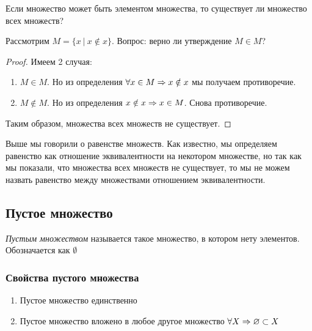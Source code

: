 Если множество может быть элементом множества, то существует ли множество всех множеств?
 
\begin{proposition}
    Рассмотрим $M = \{x\ |\ x \notin x\}$. Вопрос: верно ли утверждение $M \in M$?
\end{proposition}
 
\begin{proof}
    Имеем 2 случая:
    
    \begin{enumerate}
        \item $M \in M$. Но из определения $\forall x \in M \Rightarrow x \notin x$ мы получаем противоречие.
        \item $M \notin M$. Но из определения $x \notin x \Rightarrow x \in M$. Снова противоречие.
    \end{enumerate}
    
    Таким образом, множества всех множеств не существует.
\end{proof}
 
\begin{note}
    Выше мы говорили о равенстве множеств. Как известно, мы определяем равенство как отношение эквивалентности на некотором множестве, но так как мы показали, что множества всех множеств не существует, то мы не можем назвать равенство между множествами отношением эквивалентности.
\end{note}
 
\subsection{Пустое множество}
 
\begin{definition}
    \textit{Пустым множеством} называется такое множество, в котором нету элементов. Обозначается как $\emptyset$
\end{definition}
 
\subsubsection*{Свойства пустого множества}
 
\begin{enumerate}
     \item Пустое множество единственно
     \item Пустое множество вложено в любое другое множество $\forall X \Rightarrow \varnothing \subset X$
\end{enumerate}
 
